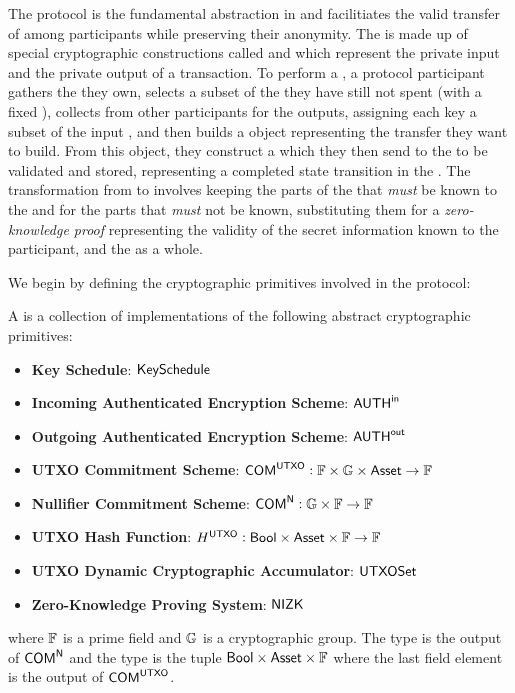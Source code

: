 The \Transfer{} protocol is the fundamental abstraction in \MantaPay{} and facilitiates the valid transfer of  among participants while preserving their anonymity. The \Transfer{} is made up of special cryptographic constructions called  and  which represent the private input and the private output of a transaction. To perform a \Transfer{}, a protocol participant gathers the  they own, selects a subset of the  they have still not spent (with a fixed \AssetId{}), collects  from other participants for the outputs, assigning each key a subset of the input , and then builds a \Transfer{} object representing the transfer they want to build. From this \Transfer{} object, they construct a \TransferPost{} which they then send to the \Ledger{} to be validated and stored, representing a completed state transition in the \Ledger{}. The transformation from \Transfer{} to \TransferPost{} involves keeping the parts of the \Transfer{} that \emph{must} be known to the \Ledger{} and for the parts that \emph{must} not be known, substituting them for a \emph{zero-knowledge proof} representing the validity of the secret information known to the participant, and the \Transfer{} as a whole.

We begin by defining the cryptographic primitives involved in the \Transfer{} protocol:

\begin{definition}
    A \TransferConfiguration{} is a collection of implementations of the following abstract cryptographic primitives:
    \begin{itemize}
        \item \textbf{Key Schedule}: ${\textsf{KeySchedule}}$
        \item \textbf{Incoming Authenticated Encryption Scheme}: ${{\textsf{AUTH}}^\textsf{in}}$
        \item \textbf{Outgoing Authenticated Encryption Scheme}: ${{\textsf{AUTH}}^\textsf{out}}$
        \item \textbf{UTXO Commitment Scheme}: ${\textsf{COM}}^{{\textsf{UTXO}}} : {\mathbb{F}} \times {\mathbb{G}} \times {\textsf{Asset}} \to {\mathbb{F}}$
        \item \textbf{Nullifier Commitment Scheme}: ${\textsf{COM}}^{\textsf{N}} : {\mathbb{G}} \times {\mathbb{F}} \to {\mathbb{F}}$
        \item \textbf{UTXO Hash Function}: $H^{{\textsf{UTXO}}} : {\textsf{Bool}} \times {\textsf{Asset}} \times {\mathbb{F}} \to {\mathbb{F}}$
        \item \textbf{UTXO Dynamic Cryptographic Accumulator}: ${\textsf{UTXOSet}}$
        \item \textbf{Zero-Knowledge Proving System}: ${\textsf{NIZK}}$
    \end{itemize}
    where ${\mathbb{F}}$ is a prime field and ${\mathbb{G}}$ is a cryptographic group. The \Nullifier{} type is the output of ${\textsf{COM}}^{\textsf{N}}$ and the \UTXO{} type is the tuple ${\textsf{Bool}} \times {\textsf{Asset}} \times {\mathbb{F}}$ where the last field element is the output of ${\textsf{COM}}^{{\textsf{UTXO}}}$.
\end{definition}

